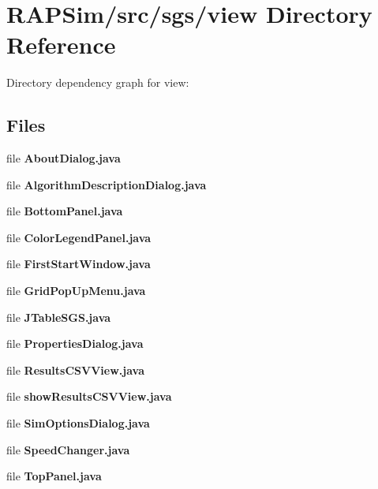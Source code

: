 \section{R\-A\-P\-Sim/src/sgs/view Directory Reference}
\label{dir_d40d2128f6a005ac56b48e97c327b103}
Directory dependency graph for view\-:
\subsection*{Files}
\begin{DoxyCompactItemize}
\item 
file {\bf About\-Dialog.\-java}
\item 
file {\bf Algorithm\-Description\-Dialog.\-java}
\item 
file {\bf Bottom\-Panel.\-java}
\item 
file {\bf Color\-Legend\-Panel.\-java}
\item 
file {\bf First\-Start\-Window.\-java}
\item 
file {\bf Grid\-Pop\-Up\-Menu.\-java}
\item 
file {\bf J\-Table\-S\-G\-S.\-java}
\item 
file {\bf Properties\-Dialog.\-java}
\item 
file {\bf Results\-C\-S\-V\-View.\-java}
\item 
file {\bf show\-Results\-C\-S\-V\-View.\-java}
\item 
file {\bf Sim\-Options\-Dialog.\-java}
\item 
file {\bf Speed\-Changer.\-java}
\item 
file {\bf Top\-Panel.\-java}
\end{DoxyCompactItemize}
